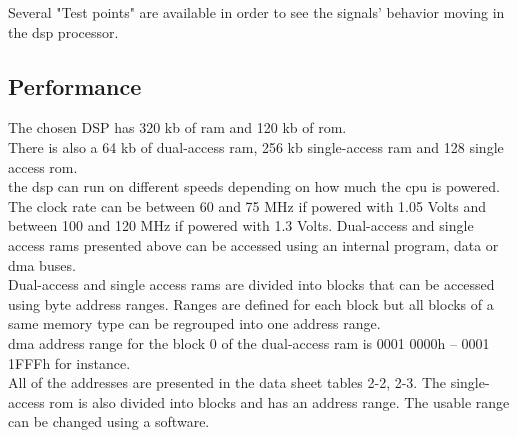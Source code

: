 Several "Test points" are available in order to see the signals' behavior moving in the \gls{dsp} processor.

\subsection{Performance}

The chosen DSP has 320 \gls{kb} of \gls{ram} and 120 \gls{kb} of \gls{rom}. \\
There is also a 64 \gls{kb} of dual-access \gls{ram}, 256 \gls{kb} single-access \gls{ram} and 128 single access \gls{rom}. \\
the \gls{dsp} can run on different speeds depending on how much the \gls{cpu} is powered. The clock rate can be between 60 and 75 MHz if powered with 1.05 Volts and between 100 and 120 MHz if powered with 1.3 Volts. 
Dual-access and single access \gls{ram}s presented above can be accessed using an internal program, data or \gls{dma} buses. \\
Dual-access and single access \gls{ram}s are divided into blocks that can be accessed using byte address ranges. Ranges are defined for each block but all blocks of a same memory type can be regrouped into one address range. \\
\gls{dma} address range for the block 0 of the dual-access \gls{ram} is 0001 0000h – 0001 1FFFh for instance. \\
All of the addresses are presented in the data sheet tables 2-2, 2-3.
The single-access \gls{rom} is also divided into blocks and has an address range. The usable range can be changed using a software. \\